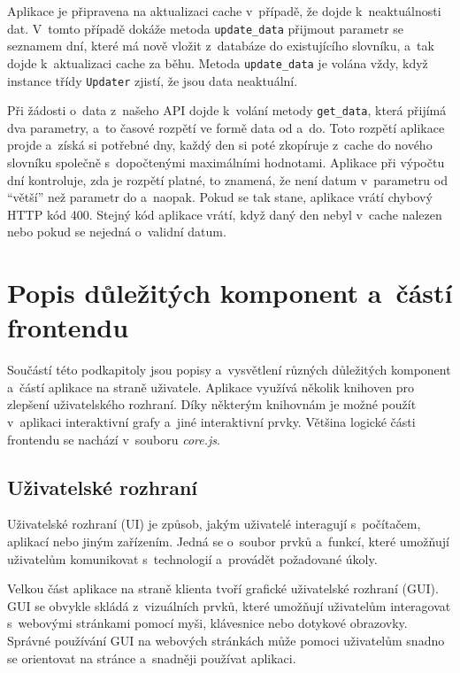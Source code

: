 Aplikace je připravena na aktualizaci cache v~případě, že dojde k~neaktuálnosti dat. V~tomto případě dokáže metoda \lstinline{update_data} přijmout parametr se seznamem dní, které má nově vložit z~databáze do existujícího slovníku, a~tak dojde k~aktualizaci cache za běhu. Metoda \lstinline{update_data} je volána vždy, když instance třídy \lstinline{Updater} zjistí, že jsou data neaktuální.

Při žádosti o~data z~našeho API dojde k~volání metody \lstinline{get_data}, která přijímá dva parametry, a~to časové rozpětí ve formě data od a~do. Toto rozpětí aplikace projde a~získá si potřebné dny, každý den si poté zkopíruje z~cache do nového slovníku společně s~dopočtenými maximálními hodnotami. Aplikace při výpočtu dní kontroluje, zda je rozpětí platné, to znamená, že není datum v~parametru od \enquote{větší} než parametr do a~naopak. Pokud se tak stane, aplikace vrátí chybový HTTP kód 400. Stejný kód aplikace vrátí, když daný den nebyl v~cache nalezen nebo pokud se nejedná o~validní datum.

\section{Popis důležitých komponent a~částí frontendu}

Součástí této podkapitoly jsou popisy a~vysvětlení různých důležitých komponent a~částí aplikace na straně uživatele. Aplikace využívá několik knihoven pro zlepšení uživatelského rozhraní. Díky některým knihovnám je možné použít v~aplikaci interaktivní grafy a~jiné interaktivní prvky. Většina logické části frontendu se nachází v~souboru \emph{core.js}.

\subsection{Uživatelské rozhraní}
\label{gui}

Uživatelské rozhraní (UI) je způsob, jakým uživatelé interagují s~počítačem, aplikací nebo jiným zařízením. Jedná se o~soubor prvků a~funkcí, které umožňují uživatelům komunikovat s~technologií a~provádět požadované úkoly.

Velkou část aplikace na straně klienta tvoří grafické uživatelské rozhraní (GUI). GUI se obvykle skládá z~vizuálních prvků, které umožňují uživatelům interagovat s~webovými stránkami pomocí myši, klávesnice nebo dotykové obrazovky. Správné používání GUI na webových stránkách může pomoci uživatelům snadno se orientovat na stránce a~snadněji používat aplikaci. 

